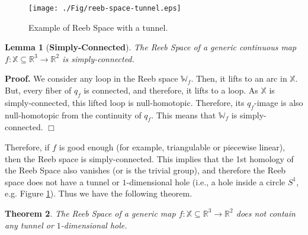 \documentclass[twocolumn]{article}
\newtheorem{theorem}{Theorem}[section]
\newtheorem{lemma}[theorem]{Lemma}
\newcommand{\RS}{\mathbb{W}_f}
\newcommand{\figref}[1]{Figure \ref{fig:#1}}
\renewenvironment{proof}{{\bf Proof. }}{\hspace*{\fill}$\Box$\bigskip\noindent}
\begin{document}
\begin{figure}[t!]
\begin{center}
\texttt{[image: ./Fig/reeb-space-tunnel.eps]}
\caption{Example of Reeb Space with a tunnel.}
\label{fig:reeb-tunnel}
\end{center}
\end{figure} 


\begin{lemma}[\textbf{Simply-Connected}]
\label{lem:contractible}
The Reeb Space of a generic continuous map $f: \mathbb{X} \subseteq\mathbb{R}^3\rightarrow \mathbb{R}^2$ is simply-connected.
\end{lemma}
\noindent
\begin{proof} We consider any loop 
in the Reeb space $\RS$. Then, it lifts to an arc
in $\mathbb{X}$. But, every fiber of $q_f$ is connected,
and therefore, it lifts to a loop.
As $\mathbb{X}$ is simply-connected, this lifted loop
is null-homotopic. Therefore, its $q_f$-image
is also null-homotopic from the continuity of $q_f$. This means that $\RS$
is simply-connected. 
\end{proof}

\noindent
Therefore, if $f$ is good enough (for example,
triangulable or piecewise linear), then the Reeb space
is simply-connected. This implies that the 1st homology of the Reeb
Space also vanishes (or is the trivial group),
and therefore the Reeb space does not have a tunnel or $1$-dimensional
hole (i.e., a hole inside a circle $S^1$, e.g. \figref{reeb-tunnel}). Thus we
have the following theorem.
\begin{theorem}
\label{thm:tunnel}
The Reeb Space of a generic map $f: \mathbb{X}
\subseteq\mathbb{R}^3\rightarrow \mathbb{R}^2$ does not contain any
tunnel or $1$-dimensional hole.
\end{theorem}
\end{document}
